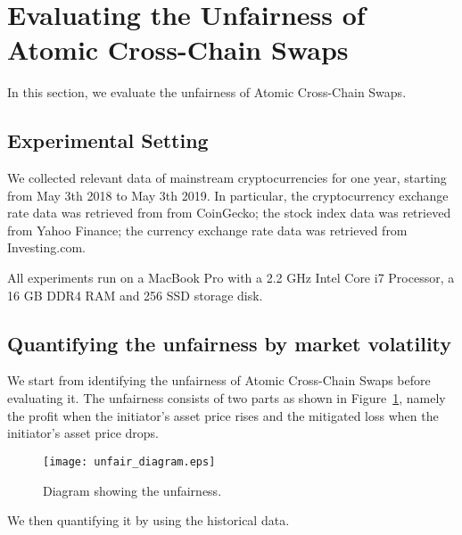 \section{Evaluating the Unfairness of Atomic Cross-Chain Swaps}
\label{sec:evaluation}

In this section, we evaluate the unfairness of Atomic Cross-Chain Swaps. 

\subsection{Experimental Setting}

We collected relevant data of mainstream cryptocurrencies for one year, starting from May 3th 2018 to May 3th 2019.
In particular, the cryptocurrency exchange rate data was retrieved from from CoinGecko;
the stock index data was retrieved from Yahoo Finance;
the currency exchange rate data was retrieved from Investing.com. 

All experiments run on a MacBook Pro with a 2.2 GHz Intel Core i7 Processor, a 16 GB DDR4 RAM and 256 SSD storage disk.

\subsection{Quantifying the unfairness by market volatility}
\label{subsec:volatility_analysis}

We start from identifying the unfairness of Atomic Cross-Chain Swaps before evaluating it.
The unfairness consists of two parts as shown in Figure~\ref{fig:unfair_diagram}, namely the profit when the initiator's asset price rises and the mitigated loss when the initiator's asset price drops.

\begin{figure}
    \texttt{[image: unfair\_diagram.eps]}
    \caption{Diagram showing the unfairness. }
    \label{fig:unfair_diagram}
\end{figure}

We then quantifying it by using the historical data.

